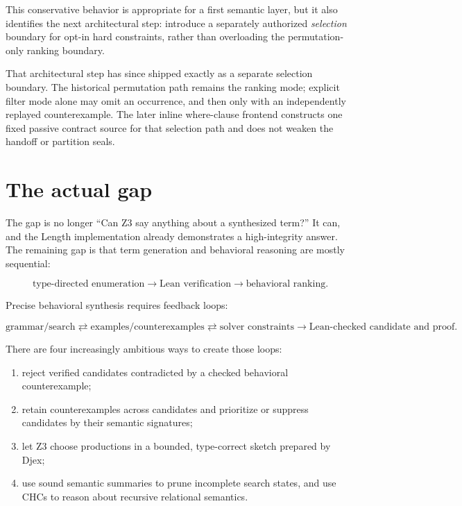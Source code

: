 \documentclass[11pt,oneside]{report}
\begin{document}
This conservative behavior is appropriate for a first semantic layer, but it also identifies the next architectural step: introduce a separately authorized \emph{selection} boundary for opt-in hard constraints, rather than overloading the permutation-only ranking boundary.

That architectural step has since shipped exactly as a separate selection
boundary. The historical permutation path remains the ranking mode; explicit
filter mode alone may omit an occurrence, and then only with an independently
replayed counterexample. The later inline where-clause frontend constructs one
fixed passive contract source for that selection path and does not weaken the
handoff or partition seals.

\section{The actual gap}

The gap is no longer ``Can Z3 say anything about a synthesized term?'' It can, and the Length implementation already demonstrates a high-integrity answer. The remaining gap is that term generation and behavioral reasoning are mostly sequential:

\begin{equation*}
\text{type-directed enumeration}
\longrightarrow
\text{Lean verification}
\longrightarrow
\text{behavioral ranking}.
\end{equation*}

Precise behavioral synthesis requires feedback loops:

\begin{equation*}
\text{grammar/search}
\rightleftarrows
\text{examples/counterexamples}
\rightleftarrows
\text{solver constraints}
\longrightarrow
\text{Lean-checked candidate and proof}.
\end{equation*}

There are four increasingly ambitious ways to create those loops:

\begin{enumerate}[leftmargin=2em]
\item reject verified candidates contradicted by a checked behavioral counterexample;
\item retain counterexamples across candidates and prioritize or suppress candidates by their semantic signatures;
\item let Z3 choose productions in a bounded, type-correct sketch prepared by Djex;
\item use sound semantic summaries to prune incomplete search states, and use CHCs to reason about recursive relational semantics.
\end{enumerate}
\end{document}
